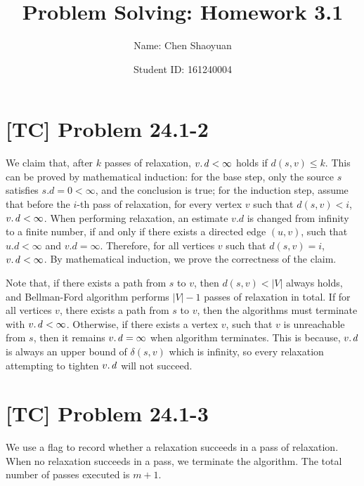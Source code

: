 \documentclass[a4paper,11pt,twocolumn]{article}
\newcommand{\homeworkno}{3.1}
\begin{document}
  \title{Problem Solving: Homework \homeworkno}
  \author{Name: Chen Shaoyuan \and Student ID: 161240004}
  \maketitle

  \section{[TC] Problem 24.1-2}
  We claim that, after $k$ passes of relaxation, $\attrib{v}{d} < \infty$ holds if $d(s, v) \leq k$. This can be proved by mathematical induction: for the base step, only the source $s$ satisfies $s.d = 0 < \infty$, and the conclusion is true; for the induction step, assume that before the $i$-th pass of relaxation, for every vertex $v$ such that $d(s, v) < i$,  $\attrib{v}{d} < \infty$. When performing relaxation, an estimate $v.d$ is changed from infinity to a finite number, if and only if there exists a directed edge $(u, v)$, such that $u.d < \infty$ and $v.d = \infty$. Therefore, for all vertices $v$ such that $d(s, v) = i$, $\attrib{v}{d} < \infty$. By mathematical induction, we prove the correctness of the claim. \par
  Note that, if there exists a path from $s$ to $v$, then $d(s, v) < |V|$ always holds, and Bellman-Ford algorithm performs $|V|-1$ passes of relaxation in total. If for all vertices $v$, there exists a path from $s$ to $v$, then the algorithms must terminate with $\attrib{v}{d} < \infty$. Otherwise, if there exists a vertex $v$, such that $v$ is unreachable from $s$, then it remains $\attrib{v}{d} = \infty$ when algorithm terminates. This is because, $\attrib{v}{d}$ is always an upper bound of $\delta(s, v)$ which is infinity, so every relaxation attempting to tighten $\attrib{v}{d}$ will not succeed.

  \section{[TC] Problem 24.1-3}
  We use a flag to record whether a relaxation succeeds in a pass of relaxation. When no relaxation succeeds in a pass, we terminate the algorithm. The total number of passes executed is $m+1$.
\end{document}
